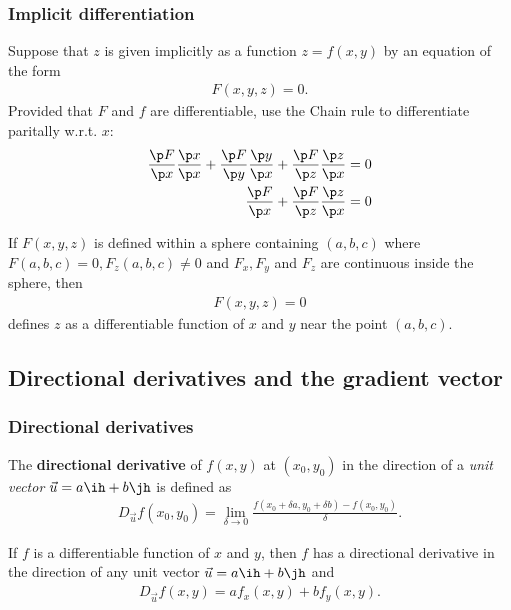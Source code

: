 \documentclass{article}
\begin{document}
\subsubsection{Implicit differentiation}

\begin{definition}
	Suppose that $z$ is given implicitly as a function $z=f(x,y)$ by an
	equation of the form
	\begin{align*}
		F(x,y,z)=0.
	\end{align*}
	Provided that $F$ and $f$ are differentiable, use the Chain rule to
	differentiate paritally w.r.t. $x$:
	\begin{align*}
		\frac{\p F}{\p x}\frac{\p x}{\p x}+\frac{\p F}{\p y}\frac{\p y}{\p x}
		+ \frac{\p F}{\p z}\frac{\p z}{\p x}                   & = 0 \\
		\frac{\p F}{\p x} + \frac{\p F}{\p z}\frac{\p z}{\p x} & = 0
	\end{align*}
\end{definition}
\begin{theorem}
	If $F(x,y,z)$ is defined within a sphere containing $(a,b,c)$
	where $F(a,b,c)=0, F_z(a,b,c)\not=0$ and $F_x,F_y$ and $F_z$ are
	continuous inside the sphere, then
	\begin{align*}
		F(x,y,z)=0
	\end{align*}
	defines $z$ as a differentiable function of $x$ and $y$ near the
	point $(a,b,c)$.
\end{theorem}


\subsection{Directional derivatives and the gradient vector}


\subsubsection{Directional derivatives}

\begin{definition}
	The \textbf{directional derivative} of $f(x,y)$ at $(x_0,y_0)$ in the
	direction of a \emph{unit vector} $\vec u=a\ih + b\jh$ is defined as
	\begin{align*}
		D_{\vec u}f(x_0, y_0)=\lim_{\delta \to 0}
		\frac{f(x_0+\delta a, y_0 + \delta b)-f(x_0, y_0)}{\delta}.
	\end{align*}
\end{definition}
\begin{theorem}
	If $f$ is a differentiable function of $x$ and $y$, then $f$
	has a directional derivative in the direction of any unit vector
	$\vec u=a\ih + b\jh$ and
	\begin{align*}
		D_{\vec u}f(x,y) = af_x(x,y) + bf_y(x,y).
	\end{align*}
\end{theorem}
\end{document}
